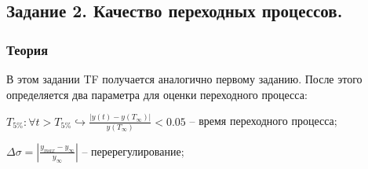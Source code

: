 \documentclass[16pt]{article}
\begin{document}
\pagebreak
\subsection{Задание 2. Качество переходных процессов.}
\subsubsection{Теория}
В этом задании TF получается аналогично первому заданию. После этого определяется два параметра для оценки переходного процесса:
\itemize
\item \(T_{5\%} : \forall t > T_{5\%} \hookrightarrow \frac{|y(t) - y(T_{\infty})|}{y(T_{\infty})} < 0.05\) -- время переходного процесса;
\item \(\Delta\sigma = |\frac{y_{max} - y_\infty}{y_\infty}|\) -- перерегулирование;
\end{document}
